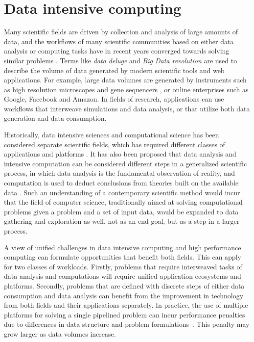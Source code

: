 \documentclass{uit-report}
\begin{document}
\section{Data intensive computing}
Many scientific fields are driven by collection and analysis of large amounts of data, and the workflows of many scientific communities based on either data analysis or computing tasks have in recent years converged towards solving similar problems \cite{bigdataconvergence}. Terms like \emph{data deluge} and \emph{Big Data revolution} are used to describe the volume of data generated by modern scientific tools and web applications. For example, large data volumes are generated by instruments such as high resolution microscopes \cite{microscopy} and gene sequencers \cite{mapreduce_locality}, or online enterprises such as Google, Facebook and Amazon. In fields of research, applications can use workflows that interweave simulations and data analysis, or that utilize both data generation and data consumption. 

Historically, data intensive sciences and computational science has been considered separate scientific fields, which has required different classes of applications and platforms \cite{Hey2009JimGO}. It has also been proposed that data analysis and intensive computation can be considered different steps in a generalized scientific process, in which data analysis is the fundamental observation of reality, and computation is used to deduct conclusions from theories built on the available data \cite{honavar2016accelerating}. Such an understanding of a contemporary scientific method would incur that the field of computer science, traditionally aimed at solving computational problems given a problem and a set of input data, would be expanded to data gathering and exploration as well, not as an end goal, but as a step in a larger process.

A view of unified challenges in data intensive computing and high performance computing can formulate opportunities that benefit both fields. This can apply for two classes of workloads. Firstly, problems that require interweaved tasks of data analysis and computations will require unified application ecosystems and platforms. Secondly, problems that are defined with discrete steps of either data consumption and data analysis can benefit from the improvement in technology from both fields and their applications separately. In practice, the use of multiple platforms for solving a single pipelined problem can incur performance penalties due to differences in data structure and problem formulations~\cite{husky}. This penalty may grow larger as data volumes increase.
\end{document}
